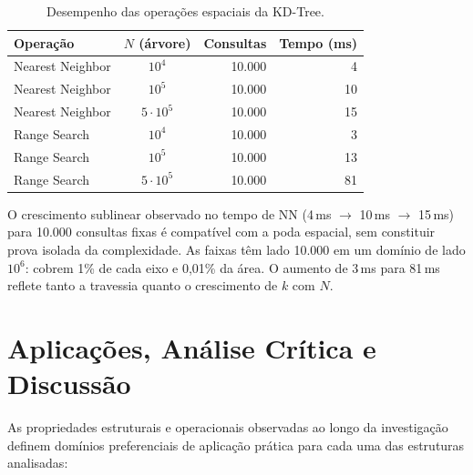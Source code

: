 \documentclass[11pt, a4paper]{article}
\begin{document}
\begin{table}[htbp]
\centering
\small
\begin{tabular}{@{}lcrr@{}}
\toprule
\textbf{Operação} & \textbf{$N$ (árvore)} & \textbf{Consultas} & \textbf{Tempo (ms)} \\ \midrule
Nearest Neighbor & $10^{4}$ & 10.000 & 4 \\
Nearest Neighbor & $10^{5}$ & 10.000 & 10 \\
Nearest Neighbor & $5\cdot10^{5}$ & 10.000 & 15 \\ \midrule
Range Search & $10^{4}$ & 10.000 & 3 \\
Range Search & $10^{5}$ & 10.000 & 13 \\
Range Search & $5\cdot10^{5}$ & 10.000 & 81 \\
\bottomrule
\end{tabular}
\caption{Desempenho das operações espaciais da KD-Tree.}
\label{tab:kdtree_spatial}
\end{table}

O crescimento sublinear observado no tempo de NN (4\,ms $\to$ 10\,ms $\to$ 15\,ms) para 10.000 consultas fixas é compatível com a poda espacial, sem constituir prova isolada da complexidade. As faixas têm lado 10.000 em um domínio de lado $10^6$: cobrem 1\% de cada eixo e 0,01\% da área. O aumento de 3\,ms para 81\,ms reflete tanto a travessia quanto o crescimento de $k$ com $N$.

\section{Aplicações, Análise Crítica e Discussão}

As propriedades estruturais e operacionais observadas ao longo da investigação definem domínios preferenciais de aplicação prática para cada uma das estruturas analisadas:
\end{document}
